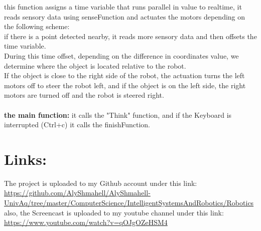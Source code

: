 \documentclass[10pt]{article}
\begin{document}
this function assigns a time variable that runs parallel in value to realtime, it reads sensory data using senseFunction and actuates the motors depending on the following scheme:\\
if there is a point detected nearby, it reads more sensory data and then offsets the time variable.\\ During this time offset, depending on the difference in coordinates value, we determine where the object is located relative to the robot.\\
If the object is close to the right side of the robot, the actuation turns the left motors off to steer the robot left, and if the object is on the left side, the right motors are turned off and the robot is steered right.\\\\

\textbf{the main function: } it calls the "Think" function, and if the Keyboard is interrupted (Ctrl+c) it calls the finishFunction.

\section{Links:}
The project is uploaded to my Github account under this link:\\
\url{https://github.com/AlyShmahell/AlyShmahell-UnivAq/tree/master/ComputerScience/IntelligentSystemsAndRobotics/Robotics}\\
also, the Screencast is uploaded to my youtube channel under this link:\\
\url{https://www.youtube.com/watch?v=qOJgOZeHSM4}
\end{document}
